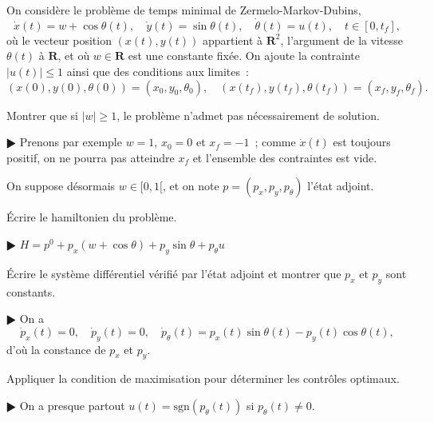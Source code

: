 \documentclass[11pt,a4paper]{article}
\def\R{\mathbf{R}}
\newcommand{\sgn}{\mathrm{sgn}}
\theoremstyle{plain}
\theoremstyle{definition}
\begin{document}
\newpage

\begin{Exercice}[10 points]
On consid\`ere le probl\`eme de temps minimal de Zermelo-Markov-Dubins,
\[ \dot{x}(t)=w+\cos\theta(t),\quad
   \dot{y}(t)=\sin\theta(t),\quad
   \dot{\theta}(t)=u(t),\quad t \in [0,t_f], \]
o\`u le vecteur position $(x(t),y(t))$ appartient \`a $\R^2$, l'argument de la
vitesse $\theta(t)$ \`a $\R$, et o\`u $w \in \R$ est une constante fix\'ee.
On ajoute la contrainte $|u(t)| \leq 1$ ainsi que des conditions aux limites~:
\[ (x(0),y(0),\theta(0)) = (x_0,y_0,\theta_0),\quad
   (x(t_f),y(t_f),\theta(t_f)) = (x_f,y_f,\theta_f). \]
\begin{Question} Montrer que si $|w| \geq 1$, le probl\`eme n'admet pas n\'ecessairement
de solution.
\end{Question}
\begin{corr} $\RHD$ Prenons par exemple $w=1$, $x_0=0$ et $x_f=-1$~; comme
$\dot{x}(t)$ est toujours positif, on ne pourra pas atteindre $x_f$ et l'ensemble des
contraintes est vide.
\end{corr}

On suppose d\'esormais $w \in [0,1[$, et on note $p=(p_x,p_y,p_\theta)$ l'\'etat adjoint.

\begin{Question} \'Ecrire le hamiltonien du probl\`eme.
\end{Question}
\begin{corr} $\RHD$ $H = p^0+p_x(w+\cos\theta)+p_y\sin\theta+p_\theta u$
\end{corr}

\begin{Question} \'Ecrire le syst\`eme diff\'erentiel v\'erifi\'e par l'\'etat adjoint
et montrer que $p_x$ et $p_y$ sont constants.
\end{Question}
\begin{corr} $\RHD$ On a
\[ \dot{p}_x(t)=0,\quad 
   \dot{p}_y(t)=0,\quad 
   \dot{p}_\theta(t)=p_x(t)\sin\theta(t)-p_y(t)\cos\theta(t), \]
d'o\`u la constance de $p_x$ et $p_y$.
\end{corr}

\begin{Question} Appliquer la condition de maximisation pour d\'eterminer les
contr\^oles optimaux.
\end{Question}
\begin{corr} $\RHD$ On a presque partout $u(t)=\sgn(p_\theta(t))$ si $p_\theta(t) \neq 0$.
\end{corr}


\end{Exercice}
\end{document}
